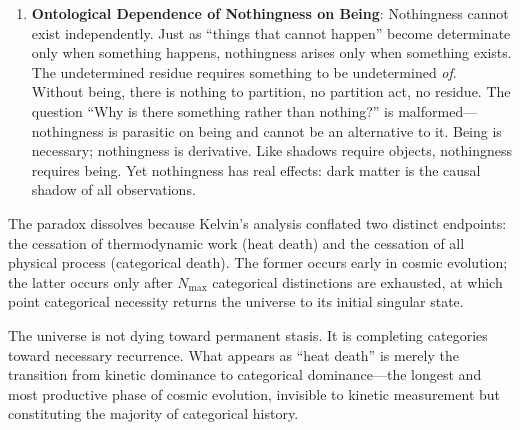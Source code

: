\documentclass[12pt,a4paper]{article}
\theoremstyle{definition}
\theoremstyle{remark}
\newcommand{\Nmax}{N_{\text{max}}}
\begin{document}
\begin{enumerate}
    \item \textbf{Ontological Dependence of Nothingness on Being}: Nothingness cannot exist independently. Just as ``things that cannot happen'' become determinate only when something happens, nothingness arises only when something exists. The undetermined residue requires something to be undetermined \emph{of}. Without being, there is nothing to partition, no partition act, no residue. The question ``Why is there something rather than nothing?'' is malformed---nothingness is parasitic on being and cannot be an alternative to it. Being is necessary; nothingness is derivative. Like shadows require objects, nothingness requires being. Yet nothingness has real effects: dark matter is the causal shadow of all observations.
\end{enumerate}

The paradox dissolves because Kelvin's analysis conflated two distinct endpoints: the cessation of thermodynamic work (heat death) and the cessation of all physical process (categorical death). The former occurs early in cosmic evolution; the latter occurs only after $\Nmax$ categorical distinctions are exhausted, at which point categorical necessity returns the universe to its initial singular state.

The universe is not dying toward permanent stasis. It is completing categories toward necessary recurrence. What appears as ``heat death'' is merely the transition from kinetic dominance to categorical dominance---the longest and most productive phase of cosmic evolution, invisible to kinetic measurement but constituting the majority of categorical history.



\end{document}
